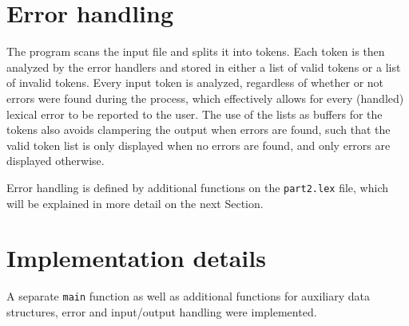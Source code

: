 \documentclass[12pt]{article}
\begin{document}
\section{Error handling}
The program scans the input file and splits it into tokens. Each token is then analyzed
by the error handlers and stored in either a list of valid tokens or a list of invalid tokens.
Every input token is analyzed, regardless of whether or not errors were found during the process,
which effectively allows for every (handled) lexical error to be reported to the user. The use
of the lists as buffers for the tokens also avoids clampering the output when errors are found, such
that the valid token list is only displayed when no errors are found, and only errors are displayed
otherwise.

Error handling is defined by additional functions on the \texttt{part2.lex} file, which will
be explained in more detail on the next Section.


\section{Implementation details}
A separate \texttt{main} function as well as additional functions for auxiliary data structures,
error and input/output handling were implemented.
\end{document}
